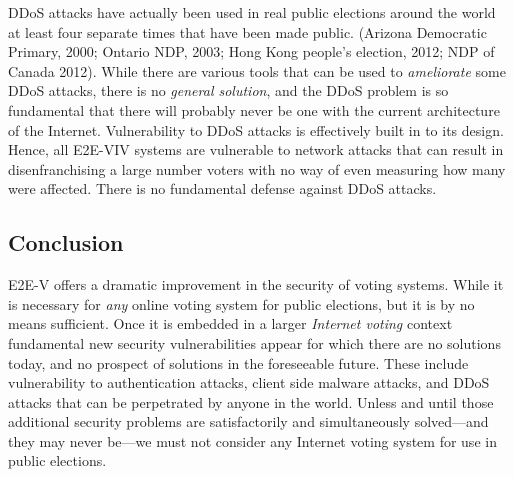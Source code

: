 DDoS attacks have actually been used in real public elections around
the world at least four separate times that have been made
public. (Arizona Democratic Primary, 2000; Ontario NDP, 2003; Hong
Kong people's election, 2012; NDP of Canada 2012). While there are
various tools that can be used to \emph{ameliorate} some DDoS attacks,
there is no \emph{general solution}, and the DDoS problem is so
fundamental that there will probably never be one with the current
architecture of the Internet. Vulnerability to DDoS attacks is
effectively built in to its design. Hence, all E2E-VIV systems are
vulnerable to network attacks that can result in disenfranchising a
large number voters with no way of even measuring how many were
affected. There is no fundamental defense against DDoS attacks.

\subsection{Conclusion}

E2E-V offers a dramatic improvement in the security of voting
systems. While it is necessary for \emph{any} online voting system for
public elections, but it is by no means sufficient. Once it is
embedded in a larger \emph{Internet voting} context fundamental new
security vulnerabilities appear for which there are no solutions
today, and no prospect of solutions in the foreseeable future. These
include vulnerability to authentication attacks, client side malware
attacks, and DDoS attacks that can be perpetrated by anyone in the
world. Unless and until those additional security problems are
satisfactorily and simultaneously solved---and they may never be---we
must not consider any Internet voting system for use in public
elections.
